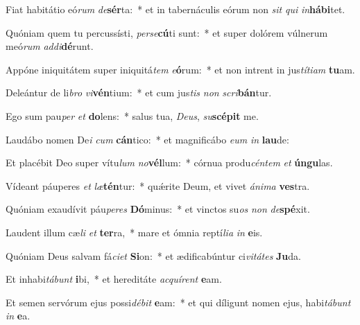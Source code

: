 \item Fiat habitátio eó\textit{rum} \textit{de}\textbf{sér}ta:~* et in tabernáculis eórum non \textit{sit} \textit{qui} \textit{in}\textbf{há}\textbf{bi}tet.
\item Quóniam quem tu percussísti, \textit{per}\textit{se}\textbf{cú}ti sunt:~* et super dolórem vúlnerum meó\textit{rum} \textit{ad}\textit{di}\textbf{dé}runt.
\item Appóne iniquitátem super iniquitá\textit{tem} \textit{e}\textbf{ó}rum:~* et non intrent in jus\textit{tí}\textit{ti}\textit{am} \textbf{tu}am.
\item Deleántur de li\textit{bro} \textit{vi}\textbf{vén}tium:~* et cum jus\textit{tis} \textit{non} \textit{scri}\textbf{bán}tur.
\item Ego sum pau\textit{per} \textit{et} \textbf{do}lens:~* salus tua, \textit{De}\textit{us}, \textit{su}\textbf{scé}\textbf{pit} me.
\item Laudábo nomen De\textit{i} \textit{cum} \textbf{cán}tico:~* et magnificábo \textit{e}\textit{um} \textit{in} \textbf{lau}de:
\item Et placébit Deo super vítu\textit{lum} \textit{no}\textbf{vél}lum:~* córnua produ\textit{cén}\textit{tem} \textit{et} \textbf{ún}\textbf{gu}las.
\item Vídeant páuperes \textit{et} \textit{læ}\textbf{tén}tur:~* quǽrite Deum, et vivet \textit{á}\textit{ni}\textit{ma} \textbf{ves}tra.
\item Quóniam exaudívit páu\textit{pe}\textit{res} \textbf{Dó}minus:~* et vinctos su\textit{os} \textit{non} \textit{de}\textbf{spé}xit.
\item Laudent illum cæ\textit{li} \textit{et} \textbf{ter}ra,~* mare et ómnia reptí\textit{li}\textit{a} \textit{in} \textbf{e}is.
\item Quóniam Deus salvam fá\textit{ci}\textit{et} \textbf{Si}on:~* et ædificabúntur ci\textit{vi}\textit{tá}\textit{tes} \textbf{Ju}da.
\item Et inhabi\textit{tá}\textit{bunt} \textbf{i}bi,~* et hereditáte \textit{ac}\textit{quí}\textit{rent} \textbf{e}am.
\item Et semen servórum ejus possi\textit{dé}\textit{bit} \textbf{e}am:~* et qui díligunt nomen ejus, habi\textit{tá}\textit{bunt} \textit{in} \textbf{e}a.
